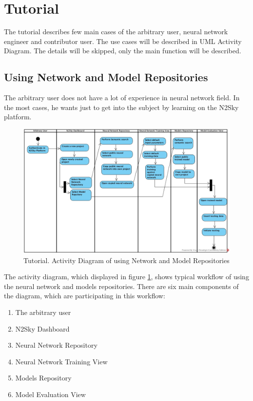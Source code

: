 \section{Tutorial}\label{Tutorial}

The tutorial describes few main cases of the arbitrary user, neural network engineer and contributor user. The use cases will be described in UML  Activity Diagram. The details will be skipped, only the main function will be described.  

\subsection{Using Network and Model Repositories}\label{Using Network and Model Repositories}

The arbitrary user does not have a lot of experience in neural network field. In the most cases, he wants just to get into the subject by learning on the N2Sky platform. 

\begin{figure}[htbp]
\begin{center}
  \includegraphics[width=\linewidth]{components/tutorial/img/training_arbitrary.jpg}
  \caption{Tutorial. Activity Diagram of using Network and Model Repositories}
  \label{fig:training_arbitrary}
\end{center}
\end{figure} 

The activity diagram, which displayed in figure \ref{fig:training_arbitrary}, shows typical workflow of using the neural network and models repositories. There are six main components of the diagram, which are participating in this workflow: 
\begin{enumerate}
\item The arbitrary user
\item N2Sky Dashboard
\item Neural Network Repository
\item Neural Network Training View
\item Models Repository
\item Model Evaluation View
\end{enumerate}

